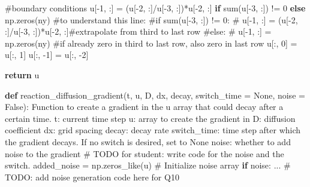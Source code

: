 \documentclass[
  letterpaper,
  DIV=11,
  numbers=noendperiod]{scrreprt}
\newenvironment{Shaded}{\begin{snugshade}}{\end{snugshade}}
\newcommand{\AlertTok}[1]{\textcolor[rgb]{0.68,0.00,0.00}{#1}}
\newcommand{\BuiltInTok}[1]{\textcolor[rgb]{0.00,0.23,0.31}{#1}}
\newcommand{\CommentTok}[1]{\textcolor[rgb]{0.37,0.37,0.37}{#1}}
\newcommand{\ControlFlowTok}[1]{\textcolor[rgb]{0.00,0.23,0.31}{\textbf{#1}}}
\newcommand{\DecValTok}[1]{\textcolor[rgb]{0.68,0.00,0.00}{#1}}
\newcommand{\KeywordTok}[1]{\textcolor[rgb]{0.00,0.23,0.31}{\textbf{#1}}}
\newcommand{\NormalTok}[1]{\textcolor[rgb]{0.00,0.23,0.31}{#1}}
\newcommand{\OperatorTok}[1]{\textcolor[rgb]{0.37,0.37,0.37}{#1}}
\newcommand{\VariableTok}[1]{\textcolor[rgb]{0.07,0.07,0.07}{#1}}
\theoremstyle{definition}
\theoremstyle{remark}
\begin{document}
\begin{tcolorbox}
\begin{Shaded}
\begin{Highlighting}[]
    \CommentTok{\#boundary conditions}
\NormalTok{    u[}\OperatorTok{{-}}\DecValTok{1}\NormalTok{, :] }\OperatorTok{=}\NormalTok{ (u[}\OperatorTok{{-}}\DecValTok{2}\NormalTok{, :]}\OperatorTok{/}\NormalTok{u[}\OperatorTok{{-}}\DecValTok{3}\NormalTok{, :])}\OperatorTok{*}\NormalTok{u[}\OperatorTok{{-}}\DecValTok{2}\NormalTok{, :]  }\ControlFlowTok{if} \BuiltInTok{sum}\NormalTok{(u[}\OperatorTok{{-}}\DecValTok{3}\NormalTok{, :]) }\OperatorTok{!=} \DecValTok{0} \ControlFlowTok{else}\NormalTok{ np.zeros(ny)}
    \CommentTok{\#to understand this line:}
    \CommentTok{\#if sum(u[{-}3, :]) != 0:}
    \CommentTok{\#    u[{-}1, :] = (u[{-}2, :]/u[{-}3, :])*u[{-}2, :]\#extrapolate from third to last row}
    \CommentTok{\#else:}
    \CommentTok{\#    u[{-}1, :] = np.zeros(ny) \#if already zero in third to last row, also zero in last row}
\NormalTok{    u[:, }\DecValTok{0}\NormalTok{] }\OperatorTok{=}\NormalTok{ u[:, }\DecValTok{1}\NormalTok{]}
\NormalTok{    u[:, }\OperatorTok{{-}}\DecValTok{1}\NormalTok{] }\OperatorTok{=}\NormalTok{ u[:, }\OperatorTok{{-}}\DecValTok{2}\NormalTok{]}

    \ControlFlowTok{return}\NormalTok{ u}

\KeywordTok{def}\NormalTok{ reaction\_diffusion\_gradient(t, u, D, dx, decay, switch\_time }\OperatorTok{=} \VariableTok{None}\NormalTok{, noise }\OperatorTok{=} \VariableTok{False}\NormalTok{):}
    \CommentTok{\textquotesingle{}\textquotesingle{}\textquotesingle{}}
\CommentTok{    Function to create a gradient in the u array that could decay after a certain time.}
\CommentTok{    t: current time step}
\CommentTok{    u: array to create the gradient in}
\CommentTok{    D: diffusion coefficient}
\CommentTok{    dx: grid spacing}
\CommentTok{    decay: decay rate}
\CommentTok{    switch\_time: time step after which the gradient decays. If no switch is desired, set to None}
\CommentTok{    noise: whether to add noise to the gradient}
\CommentTok{    \textquotesingle{}\textquotesingle{}\textquotesingle{}}
    \CommentTok{\# }\AlertTok{TODO}\CommentTok{ for student: write code for the noise and the switch.}
\NormalTok{    added\_noise }\OperatorTok{=}\NormalTok{ np.zeros\_like(u)  }\CommentTok{\# Initialize noise array}
    \ControlFlowTok{if}\NormalTok{ noise:}
\NormalTok{        ...  }\CommentTok{\# }\AlertTok{TODO}\CommentTok{: add noise generation code here for Q10}
    

\end{Highlighting}
\end{Shaded}
\end{tcolorbox}
\end{document}
